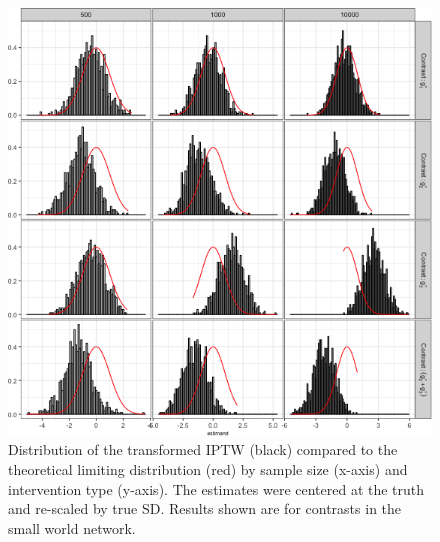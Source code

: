 \documentclass[english]{article}\usepackage[]{graphicx}\usepackage[]{color}
\makeatletter
\def\maxwidth{ %
  \ifdim\Gin@nat@width>\linewidth
    \linewidth
  \else
    \Gin@nat@width
  \fi
}
\newenvironment{knitrout}{}{} %
\theoremstyle{plain}
\theoremstyle{plain}
\makeatother
\begin{document}
\begin{knitrout}\footnotesize
{}\color{fgcolor}\begin{figure}

{\centering \includegraphics[width=\maxwidth]{TablesFigs/knitR-hist_IPTW_ATE_smwld-1} 

}

\caption[Distribution of the transformed IPTW (black) compared to the theoretical limiting distribution (red) by sample size (x-axis) and intervention type (y-axis)]{Distribution of the transformed IPTW (black) compared to the theoretical limiting distribution (red) by sample size (x-axis) and intervention type (y-axis). The estimates were centered at the truth and re-scaled by true SD. Results shown are for contrasts in the small world network.}\label{fig:hist.IPTW.ATE.smwld}
\end{figure}


\end{knitrout}
\end{document}

